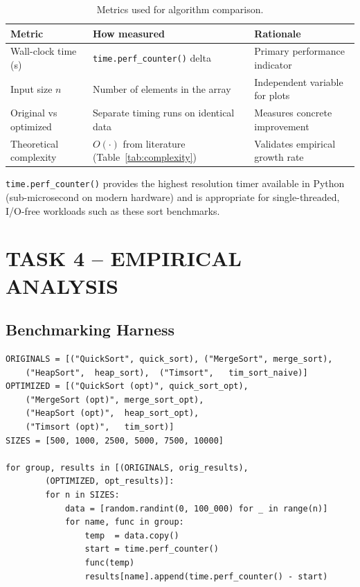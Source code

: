 \documentclass[12pt,a4paper]{article}
\begin{document}
	\begin{table}[h!]
		\centering
		\caption{Metrics used for algorithm comparison.}
		\label{tab:metrics}
		\renewcommand{\arraystretch}{1.3}
		\begin{tabular}{lll}
			\toprule
			\textbf{Metric}        & \textbf{How measured}                           & \textbf{Rationale} \\
			\midrule
			Wall-clock time (s)    & \texttt{time.perf\_counter()} delta             & Primary performance indicator \\
			Input size $n$         & Number of elements in the array                 & Independent variable for plots \\
			Original vs optimized  & Separate timing runs on identical data          & Measures concrete improvement \\
			Theoretical complexity & $O(\cdot)$ from literature (Table~\ref{tab:complexity}) & Validates empirical growth rate \\
			\bottomrule
		\end{tabular}
	\end{table}
	
	\noindent \texttt{time.perf\_counter()} provides the highest resolution timer
	available in Python (sub-microsecond on modern hardware) and is appropriate
	for single-threaded, I/O-free workloads such as these sort benchmarks.
	
	\section{TASK 4 -- EMPIRICAL ANALYSIS}
	
	\subsection{Benchmarking Harness}
	
	\begin{lstlisting}[caption={Benchmarking loop -- original and optimized implementations timed
			separately on identical data.}]
ORIGINALS = [("QuickSort", quick_sort), ("MergeSort", merge_sort),
	("HeapSort",  heap_sort),  ("Timsort",   tim_sort_naive)]
OPTIMIZED = [("QuickSort (opt)", quick_sort_opt),
	("MergeSort (opt)", merge_sort_opt),
	("HeapSort (opt)",  heap_sort_opt),
	("Timsort (opt)",   tim_sort)]
SIZES = [500, 1000, 2500, 5000, 7500, 10000]
		
for group, results in [(ORIGINALS, orig_results),
		(OPTIMIZED, opt_results)]:
		for n in SIZES:
			data = [random.randint(0, 100_000) for _ in range(n)]
			for name, func in group:
				temp  = data.copy()
				start = time.perf_counter()
				func(temp)
				results[name].append(time.perf_counter() - start)
	\end{lstlisting}
	
\end{document}
